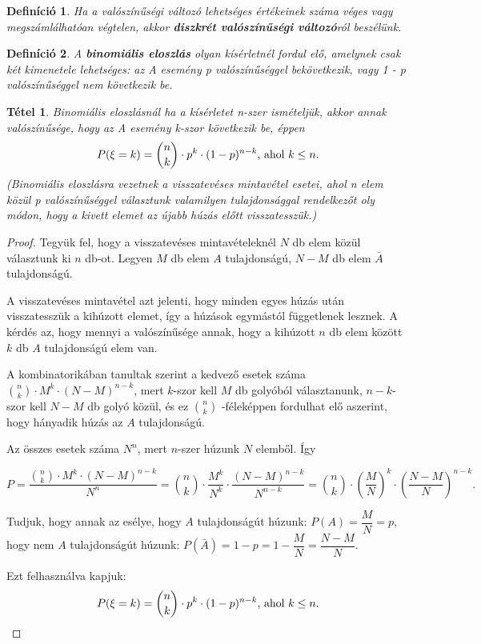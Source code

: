 \documentclass[12pt,a4paper]{article}
\newtheorem{theorem}{Tétel} [section]
\newtheorem{definition}{Definíció} [section]
\begin{document}
\begin{definition}
Ha a valószínűségi változó lehetséges értékeinek száma véges vagy megszámlálhatóan végtelen, akkor \textbf{diszkrét valószínűségi változó}ról beszélünk.
\end{definition}
\begin{definition}
 A \textbf{binomiális eloszlás} olyan kísérletnél fordul elő, amelynek csak két kimenetele lehetséges: az A esemény p valószínűséggel bekövetkezik, vagy 1 - p valószínűséggel nem következik be.
\end{definition}
\begin{theorem}
Binomiális eloszlásnál ha a kísérletet n-szer ismételjük, akkor annak valószínűsége, hogy az A esemény k-szor következik be, éppen
\[P(\xi=k)=\binom{n}{k}\cdot p^k\cdot (1-p)^{n-k}\text{\normalfont , ahol }k\leq n.\]
(Binomiális eloszlásra vezetnek a visszatevéses mintavétel esetei, ahol n elem közül p valószínűséggel választunk valamilyen tulajdonsággal rendelkezőt oly módon, hogy a kivett elemet az újabb húzás előtt visszatesszük.)
\end{theorem}

\begin{proof}
Tegyük fel, hogy a visszatevéses mintavételeknél $N$ db elem közül választunk ki $n$ db-ot. Legyen $M$ db elem $A$ tulajdonságú, $N - M$ db elem $\bar{A}$ tulajdonságú.

A visszatevéses mintavétel azt jelenti, hogy minden egyes húzás után visszatesszük a kihúzott elemet, így a húzások egymástól függetlenek lesznek. A kérdés az, hogy mennyi a valószínűsége annak, hogy a kihúzott $n$ db elem között $k$ db $A$ tulajdonságú elem van.

A kombinatorikában tanultak szerint a kedvező esetek száma $\displaystyle\binom{n}{k}\cdot M^k\cdot(N-M)^{n-k}$, mert
$k$-szor kell $M$ db golyóból választanunk, $n - k$-szor kell $N - M$ db golyó közül, és ez $\displaystyle\binom{n}{k}$ -féleképpen fordulhat elő aszerint, hogy hányadik húzás az $A$ tulajdonságú.

Az összes esetek száma $N^n$, mert $n$-szer húzunk $N$ elemből.
Így

\[P=\dfrac{\displaystyle\binom{n}{k}\cdot M^k\cdot(N-M)^{n-k}}{N^n}=
\binom{n}{k}\cdot \dfrac{M^k}{N^k}\cdot \dfrac{(N-M)^{n-k}}{N^{n-k}}=
\binom{n}{k}\cdot \left(\dfrac{M}{N}\right)^k\cdot\left(\dfrac{N-M}{N}\right)^{n-k}.\]

Tudjuk, hogy annak az esélye, hogy $A$ tulajdonságút húzunk: $P(A)=\dfrac{M}{N}=p$, hogy nem $A$ tulajdonságút húzunk: $P(\bar{A})=1-p=1-\dfrac{M}{N}=\dfrac{N-M}{N}$.

Ezt felhasználva kapjuk:
\[P(\xi=k)=\binom{n}{k}\cdot p^k\cdot (1-p)^{n-k}\text{\normalfont , ahol }k\leq n.\]

\end{proof}
\end{document}

